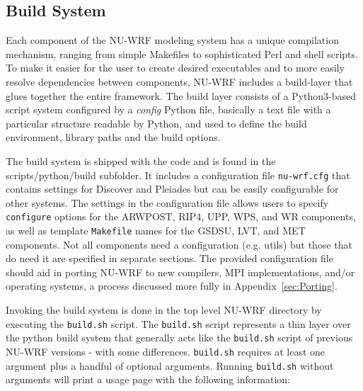 \subsection{Build System}
\label{subsec:BuildSystem}
Each component of the NU-WRF modeling system has a unique compilation 
mechanism, ranging from simple Makefiles to sophisticated Perl and shell 
scripts. To make it easier for the user to create desired executables and to 
more easily resolve dependencies between components, NU-WRF includes a 
build-layer that glues together the entire framework. The build layer consists of a
Python3-based script system configured by a \emph{config} Python file, basically a text file 
with a particular structure readable by Python, and used to define the build environment, 
library paths and  the build options. 

The build system is shipped with the code and is found in the scripts/python/build subfolder. 
It includes a configuration file \texttt{nu-wrf.cfg} that contains settings for Discover and Pleiades but can be easily configurable for other systems. The settings in the configuration file allows users to specify 
\texttt{configure} options for the ARWPOST, RIP4, UPP, WPS, and WR components, as well as template \texttt{Makefile} names for the  GSDSU, LVT, and MET components. Not all components 
need a configuration (e.g. utils) but those that do need it are specified in separate sections. 
The provided configuration file should aid in porting NU-WRF to new 
compilers, MPI implementations, and/or operating systems, a process discussed 
more fully in Appendix~\ref{sec:Porting}. 

Invoking the build system is done in the top level NU-WRF directory by executing the \texttt{build.sh} script.
The \texttt{build.sh} script represents a thin layer over the python build system that generally acts like the \texttt{build.sh} script of previous NU-WRF versions - with some differences. \texttt{build.sh} requires at least one argument plus a handful of optional arguments. Running \texttt{build.sh} without arguments will print a usage page with the following information:

